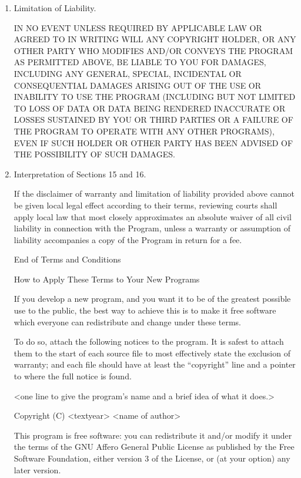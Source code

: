 \documentclass[10pt,a4paper,ngerman,titlepage,tocindentauto]{article}
\begin{document}
\begin{multicols}{3}
{\begin{enumerate}
						\item Limitation of Liability.

						 IN NO EVENT UNLESS REQUIRED BY APPLICABLE LAW OR AGREED TO IN
						 WRITING WILL ANY COPYRIGHT HOLDER, OR ANY OTHER PARTY WHO MODIFIES
						 AND/OR CONVEYS THE PROGRAM AS PERMITTED ABOVE, BE LIABLE TO YOU FOR
						 DAMAGES, INCLUDING ANY GENERAL, SPECIAL, INCIDENTAL OR CONSEQUENTIAL
						 DAMAGES ARISING OUT OF THE USE OR INABILITY TO USE THE PROGRAM
						 (INCLUDING BUT NOT LIMITED TO LOSS OF DATA OR DATA BEING RENDERED
						 INACCURATE OR LOSSES SUSTAINED BY YOU OR THIRD PARTIES OR A FAILURE
						 OF THE PROGRAM TO OPERATE WITH ANY OTHER PROGRAMS), EVEN IF SUCH
						 HOLDER OR OTHER PARTY HAS BEEN ADVISED OF THE POSSIBILITY OF SUCH
						 DAMAGES.

						\item Interpretation of Sections 15 and 16.

						If the disclaimer of warranty and limitation of liability provided
						above cannot be given local legal effect according to their terms,
						reviewing courts shall apply local law that most closely approximates
						an absolute waiver of all civil liability in connection with the
						Program, unless a warranty or assumption of liability accompanies a
						copy of the Program in return for a fee.

						\begin{center}
						{\sc End of Terms and Conditions}

						\bigskip
						How to Apply These Terms to Your New Programs
						\end{center}

						If you develop a new program, and you want it to be of the greatest
						possible use to the public, the best way to achieve this is to make it
						free software which everyone can redistribute and change under these terms.

						To do so, attach the following notices to the program.  It is safest
						to attach them to the start of each source file to most effectively
						state the exclusion of warranty; and each file should have at least
						the ``copyright'' line and a pointer to where the full notice is found.

						<one line to give the program's name and a brief idea of what it does.>

						Copyright (C) <textyear>  <name of author>

						This program is free software: you can redistribute it and/or modify
						it under the terms of the GNU Affero General Public License as published by
						the Free Software Foundation, either version 3 of the License, or
						(at your option) any later version.


\end{enumerate}}
\end{multicols}
\end{document}
